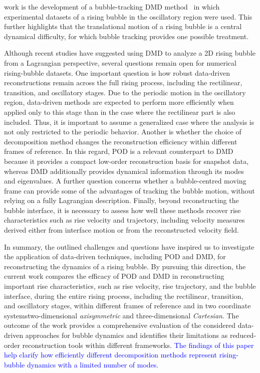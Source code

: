\documentclass[a4paper,fleqn]{cas-sc}
\newcommand{\hl}[1]{\textcolor{blue}{#1}}
\newcommand{\hl}[1]{#1}
\begin{document}
work is the development of a bubble-tracking DMD method~\cite{Yin2023} in which experimental datasets of a rising bubble in the oscillatory region were used. This further highlights that the translational motion of a rising bubble is a central dynamical difficulty, for which bubble tracking provides one possible treatment.
	
	Although recent studies have suggested using DMD to analyze a 2D rising bubble from a Lagrangian perspective, several questions remain open for numerical rising-bubble datasets. One important question is how robust data-driven reconstructions remain across the full rising process, including the rectilinear, transition, and oscillatory stages. Due to the periodic motion in the oscillatory region, data-driven methods are expected to perform more efficiently when applied only to this stage than in the case where the rectilinear part is also included. Thus, it is important to assume a generalized case where the analysis is not only restricted to the periodic behavior. Another is whether the choice of decomposition method changes the reconstruction efficiency within different frames of reference. In this regard, POD is a relevant counterpart to DMD because it provides a compact low-order reconstruction basis for snapshot data, whereas DMD additionally provides dynamical information through its modes and eigenvalues. A further question concerns whether a bubble-centred moving frame can provide some of the advantages of tracking the bubble motion, without relying on a fully Lagrangian description. Finally, beyond reconstructing the bubble interface, it is necessary to assess how well these methods recover rise characteristics such as rise velocity and trajectory, including velocity measures derived either from interface motion or from the reconstructed velocity field.
	
	In summary, the outlined challenges and questions have inspired us to investigate the application of data-driven techniques, including POD and DMD, for reconstructing the dynamics of a rising bubble. By pursuing this direction, the current work compares the efficacy of POD and DMD in reconstructing important rise characteristics, such as rise velocity, rise trajectory, and the bubble interface, during the entire rising process, including the rectilinear, transition, and oscillatory stages, within different frames of reference and in two coordinate systems\textemdash two-dimensional \textit{axisymmetric} and three-dimensional \textit{Cartesian}. The outcome of the work provides a comprehensive evaluation of the considered data-driven approaches for bubble dynamics and identifies their limitations as reduced-order reconstruction tools within different frameworks. \hl{The findings of this paper help clarify how efficiently different decomposition methods represent rising-bubble dynamics with a limited number of modes.}
	
\end{document}

